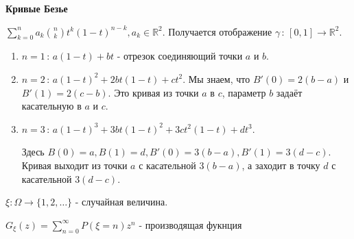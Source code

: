 \textbf{Кривые Безье}

$\sum_{k = 0}^n a_k \binom{n}{k} t^k (1 - t)^{n - k}, a_k \in \mathbb{R}^2$. Получается 
отображение $\gamma \, : \, [0, 1] \to \mathbb{R}^2$.

\begin{enumerate}
    \item {
        $n = 1 \, : \, a(1 - t) + bt$ - отрезок соединяющий точки $a$ и $b$.
    }
    \item {
        $n = 2 \, : \, a(1 - t)^2 + 2bt(1 - t) + ct^2$. Мы знаем, что $B'(0) = 2(b - a)$ и $B'(1) = 2(c - b)$.
        Это кривая из точки $a$ в $c$, параметр $b$ задаёт касательную в $a$ и $c$.
    }
    \item {
        $n = 3 \, : \, a(1 - t)^3 + 3bt(1-t)^2 + 3ct^2(1 - t) + dt^3$.

        Здесь $B(0) = a, B(1) = d, B'(0) = 3(b - a), B'(1) = 3(d - c)$. Кривая выходит
        из точки $a$ с касательной $3(b - a)$, а заходит в точку $d$ с касательной $3(d - c)$.
    }
\end{enumerate}


\begin{definition}
    $\xi : \Omega \to \{ 1, 2, \ldots \}$ - случайная величина.

    $G_{\xi} (z) = \sum_{n=0}^{\infty} P(\xi = n)z^n$ - производящая фукнция
\end{definition}


